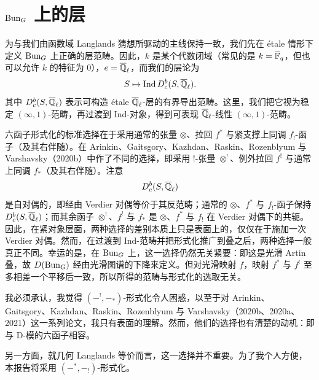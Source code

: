 \section{$\operatorname{Bun}_G$ 上的层}

为与我们由函数域 Langlands 猜想所驱动的主线保持一致，我们先在 étale 情形下定义 $\operatorname{Bun}_G$ 上正确的层范畴。因此，$k$ 是某个代数闭域（常见的是 $k=\overline{\mathbb{F}}_q$，但也可以允许 $k$ 的特征为 $0$），$e=\overline{\mathbb{Q}}_{\ell}$，而我们的层论为
\[
S\mapsto \operatorname{Ind} D^b_c(S,\overline{\mathbb{Q}}_{\ell}).
\]
其中 $D^b_c(S,\overline{\mathbb{Q}}_{\ell})$ 表示可构造 étale $\overline{\mathbb{Q}}_{\ell}$-层的有界导出范畴。这里，我们把它视为稳定 $(\infty,1)$-范畴，再过渡到 Ind-对象，得到可表现 $\overline{\mathbb{Q}}_{\ell}$-线性 $(\infty,1)$-范畴。

六函子形式化的标准选择在于采用通常的张量 $\otimes$、拉回 $f^*$ 与紧支撑上同调 $f_!$-函子（及其右伴随）。在 Arinkin、Gaitsgory、Kazhdan、Raskin、Rozenblyum 与 Varshavsky（2020b）中作了不同的选择，即采用 !-张量 $\otimes^!$、例外拉回 $f^!$ 与通常上同调 $f_*$（及其右伴随）。注意
\[
D^b_c(S,\overline{\mathbb{Q}}_{\ell})
\]
是自对偶的，即经由 Verdier 对偶等价于其反范畴；通常的 $\otimes$、$f^*$ 与 $f_!$-函子保持 $D^b_c(S,\overline{\mathbb{Q}}_{\ell})$；而其余函子 $\otimes^!$、$f^!$ 与 $f_*$ 是 $\otimes$、$f^*$ 与 $f_!$ 在 Verdier 对偶下的共轭。因此，在紧对象层面，两种选择的差别本质上只是表面上的，仅仅在于施加一次 Verdier 对偶。然而，在过渡到 Ind-范畴并把形式化推广到叠之后，两种选择一般真正不同。幸运的是，在 $\operatorname{Bun}_G$ 上，这一选择仍然无关紧要：即这是光滑 Artin 叠，故 $D(\operatorname{Bun}_G)$ 经由光滑图谱的下降来定义。但对光滑映射 $f$，映射 $f^*$ 与 $f^!$ 至多相差一个平移后一致，所以所得的范畴与形式化的选取无关。

\begin{remark}
我必须承认，我觉得 $(-^!,-_*)$-形式化令人困惑，以至于对 Arinkin、Gaitsgory、Kazhdan、Raskin、Rozenblyum 与 Varshavsky（2020b、2020a、2021）这一系列论文，我只有表面的理解。然而，他们的选择也有清楚的动机：即与 D-模的六函子相容。

另一方面，就几何 Langlands 等价而言，这一选择并不重要。为了我个人方便，本报告将采用 $(-^*,-_!)$-形式化。
\end{remark}

